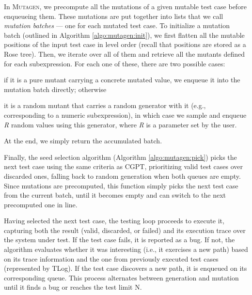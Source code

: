 \documentclass[sigconf,review,anonymous]{acmart}
\newcommand{\mutagen}{\textsc{Mutagen}\xspace}
\begin{document}
In \mutagen, we precompute all the mutations of a given mutable test case before
enqueueing them.
%
These mutations are put together into lists that we call \emph{mutation batches}
--- one for each mutated test case.
%
To initialize a mutation batch (outlined in Algorithm \ref{algo:mutagen:init}),
we first flatten all the mutable positions of the input test case in level order
(recall that positions are stored as a Rose tree).
%
Then, we iterate over all of them and retrieve all the mutants defined for each
subexpression.
%
For each one of these, there are two possible cases:
%
\begin{inparaenum}
\item if it is a pure mutant carrying a concrete mutated value, we enqueue it
  into the mutation batch directly; otherwise
\item it is a random mutant that carries a random generator with it (e.g.,
  corresponding to a numeric subexpression), in which case we sample and enqueue
  \textit{R} random values using this generator, where \textit{R} is a parameter
  set by the user.
\end{inparaenum}
%
At the end, we simply return the accumulated batch.


Finally, the seed selection algorithm (Algorithm \ref{algo:mutagen:pick}) picks
the next test case using the same criteria as CGPT, prioritizing valid test
cases over discarded ones, falling back to random generation when both queues
are empty.
%
Since mutations are precomputed, this function simply picks the next test case
from the current batch, until it becomes empty and can switch to the next
precomputed one in line.


Having selected the next test case, the testing loop proceeds to execute it,
capturing both the result (valid, discarded, or failed) and its execution trace
over the system under test.
%
If the test case fails, it is reported as a bug.
%
If not, the algorithm evaluates whether it was interesting (i.e., it exercises a
new path) based on its trace information and the one from previously executed
test cases (represented by TLog).
%
If the test case discovers a new path, it is enqueued on its corresponding
queue.
%
%
This process alternates between generation and mutation until it finds a bug or
reaches the test limit N.
\end{document}
